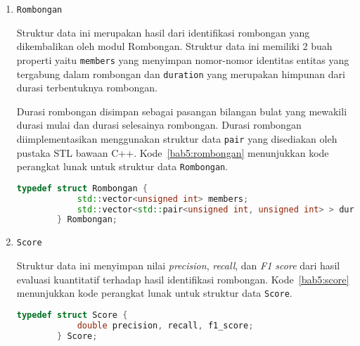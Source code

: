 \begin{enumerate}
    \item \texttt{Rombongan}
    
    Struktur data ini merupakan hasil dari identifikasi rombongan yang dikembalikan oleh modul Rombongan. Struktur data ini memiliki 2 buah properti yaitu \texttt{members} yang menyimpan nomor-nomor identitas entitas yang tergabung dalam rombongan dan \texttt{duration} yang merupakan himpunan dari durasi terbentuknya rombongan.
    
    Durasi rombongan disimpan sebagai pasangan bilangan bulat yang mewakili durasi mulai dan durasi selesainya rombongan. Durasi rombongan diimplementasikan menggunakan struktur data \texttt{pair} yang disediakan oleh pustaka STL bawaan C++. Kode~\ref{bab5:rombongan} menunjukkan kode perangkat lunak untuk struktur data \texttt{Rombongan}.
    
    \begin{lstlisting}[language=C++, caption=Implementasi \texttt{Rombongan}, label={bab5:rombongan}]
        typedef struct Rombongan {
            std::vector<unsigned int> members;
            std::vector<std::pair<unsigned int, unsigned int> > duration;
        } Rombongan;
    \end{lstlisting}
    
    \item \texttt{Score}
    
    Struktur data ini menyimpan nilai \textit{precision}, \textit{recall}, dan \textit{F1 score} dari hasil evaluasi kuantitatif terhadap hasil identifikasi rombongan. Kode~\ref{bab5:score} menunjukkan kode perangkat lunak untuk struktur data \texttt{Score}.
    
    \begin{lstlisting}[language=C++, caption=Implementasi \texttt{Score}, label={bab5:score}]
        typedef struct Score {
            double precision, recall, f1_score;
        } Score;
    \end{lstlisting}
\end{enumerate}